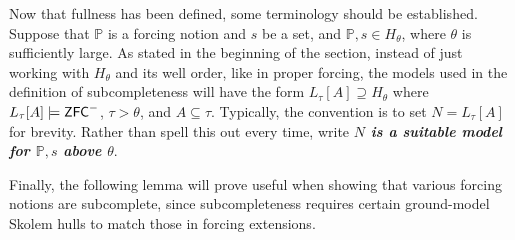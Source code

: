 \documentclass{amsart}
\theoremstyle{definition}
\theoremstyle{remark}
\renewcommand{\P}{\mathbb{P}}
\newcommand{\N}{{\overline{N}}}
\newcommand{\ZFC}{\textup{\ensuremath{\textsf{ZFC}}}}
\begin{document}

Now that fullness has been defined, some terminology should be established. Suppose that $\P$ is a forcing notion and $s$ be a set, and $\P,s \in H_\theta$, where $\theta$ is sufficiently large. As stated in the beginning of the section, instead of just working with $H_\theta$ and its well order, like in proper forcing, the models used in the definition of subcompleteness will have the form $L_\tau[A] \supseteq H_\theta$ where $L_\tau[A] \models \ZFC^-$, $\tau>\theta$, and $A \subseteq \tau$. Typically, the convention is to set $N=L_\tau[A]$ for brevity. Rather than spell this out every time, write \emph{\textbf{$N$ is a suitable model for $\P,s$ above $\theta$}}.

Finally, the following lemma will prove useful when showing that various forcing notions are subcomplete, since subcompleteness requires certain ground-model Skolem hulls to match those in forcing extensions.
\end{document}
